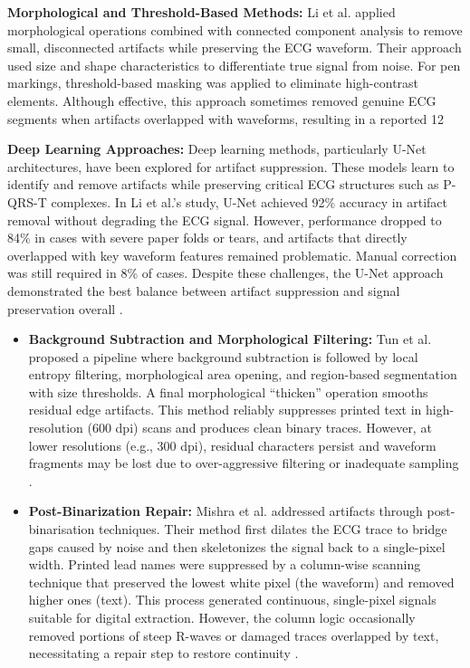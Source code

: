 \textbf{Morphological and Threshold-Based Methods:} Li et al. applied morphological operations combined with connected component analysis to remove small, disconnected artifacts while preserving the ECG waveform. Their approach used size and shape characteristics to differentiate true signal from noise. For pen markings, threshold-based masking was applied to eliminate high-contrast elements. Although effective, this approach sometimes removed genuine ECG segments when artifacts overlapped with waveforms, resulting in a reported 12%

\textbf{Deep Learning Approaches:} Deep learning methods, particularly U-Net architectures, have been explored for artifact suppression. These models learn to identify and remove artifacts while preserving critical ECG structures such as P-QRS-T complexes. In Li et al.’s study, U-Net achieved 92\% accuracy in artifact removal without degrading the ECG signal. However, performance dropped to 84\% in cases with severe paper folds or tears, and artifacts that directly overlapped with key waveform features remained problematic. Manual correction was still required in 8\% of cases. Despite these challenges, the U-Net approach demonstrated the best balance between artifact suppression and signal preservation overall \cite{LI2020104077}.

\begin{itemize}
    \item \textbf{Background Subtraction and Morphological Filtering:} Tun et al. proposed a pipeline where background subtraction is followed by local entropy filtering, morphological area opening, and region-based segmentation with size thresholds. A final morphological “thicken” operation smooths residual edge artifacts. This method reliably suppresses printed text in high-resolution (600 dpi) scans and produces clean binary traces. However, at lower resolutions (e.g., 300 dpi), residual characters persist and waveform fragments may be lost due to over-aggressive filtering or inadequate sampling \cite{Tun2017AnalysisOC}.
    \item \textbf{Post-Binarization Repair:} Mishra et al. addressed artifacts through post-binarisation techniques. Their method first dilates the ECG trace to bridge gaps caused by noise and then skeletonizes the signal back to a single-pixel width. Printed lead names were suppressed by a column-wise scanning technique that preserved the lowest white pixel (the waveform) and removed higher ones (text). This process generated continuous, single-pixel signals suitable for digital extraction. However, the column logic occasionally removed portions of steep R-waves or damaged traces overlapped by text, necessitating a repair step to restore continuity \cite{Mishra2021}. 
\end{itemize}

